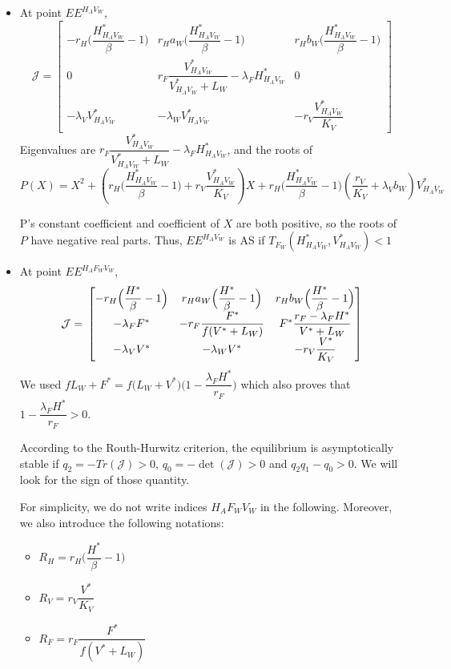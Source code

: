 \documentclass{article}
\newcommand{\lfw}{\lambda_{F}}
\newcommand{\lvw}{\lambda_{V}}
\newcommand{\lfv}{\lambda_{W}}
\begin{document}
\begin{itemize}
\item At point $EE^{H_AV_W}$,
\begin{equation}
\mathcal{J} =
\begin{bmatrix}
-r_H \Big(\dfrac{H^*_{H_AV_W} }{\beta}-1\Big) & r_H a_W \Big(\dfrac{H^*_{H_AV_W}}{\beta}-1\Big) & r_H b_W \Big(\dfrac{H^*_{H_AV_W}}{\beta}-1\Big) \\
0 & r_F \dfrac{V^*_{H_AV_W}}{V^*_{H_AV_W} + L_W}-\lfw H^*_{H_AV_W}  & 0 \\
-\lvw V^*_{H_AV_W} & -\lfv V^*_{H_AV_W} & -r_V \dfrac{V^*_{H_AV_W}}{K_V} 
\end{bmatrix}
\end{equation}
Eigenvalues are $r_F\dfrac{V^*_{H_AV_W}}{V^*_{H_AV_W} + L_W}-\lfw H^*_{H_AV_W}$, and the roots of
$$
P(X) = X^2 + \left(r_H \Big(\dfrac{H^*_{H_AV_W}}{\beta}-1\Big) + r_V \dfrac{V^*_{H_AV_W}}{K_V}  \right) X + r_H \Big(\dfrac{H^*_{H_AV_W}}{\beta}-1\Big) \left(\dfrac{r_V}{K_V} +  \lvw b_W \right) V^*_{H_AV_W}
$$

P's constant coefficient and coefficient of $X$ are both positive, so the roots of $P$ have negative real parts. Thus,  $EE^{H_AV_W}$ is AS if $T_{F_W}(H^*_{H_AV_W}, V^*_{H_AV_W}) < 1$

\item At point $EE^{H_AF_WV_W}$, 
\begin{equation}
\mathcal{J} = \\
\begin{bmatrix}
-r_H \Big(\dfrac{H^*}{\beta}-1\Big) & r_H a_W \Big(\dfrac{H^*}{\beta}-1\Big) & r_H b_W \Big(\dfrac{H^*}{\beta}-1\Big) \\
-\lfw F^* & -r_F \dfrac{F^*}{f(V^* + L_W)} & F^* \dfrac{r_F - \lfw H^*}{V^* + L_W}\\
-\lvw V^* & -\lfv V^* & -r_V \dfrac{V^*}{K_V} 
\end{bmatrix}
\end{equation}
We used $f L_W + F^* = f\Big( L_W + V^* \Big) \Big(1 - \dfrac{\lfw H^*}{r_F} \Big)$ which also proves that $1 - \dfrac{\lfw H^*}{r_F} > 0$.

According to the Routh-Hurwitz criterion, the equilibrium is asymptotically stable if $q_2 = - Tr(\mathcal{J}) > 0$, $q_0 = -\det(\mathcal{J}) > 0$ and $q_2 q_1 - q_0 > 0$. We will look for the sign of those quantity.

For simplicity, we do not write indices ${H_AF_WV_W}$ in the following. Moreover, we also introduce the following notations:
\begin{itemize}
\item $R_H = r_H \Big(\dfrac{H^*}{\beta} -1 \Big) $
\item $R_V = r_V \dfrac{V^*}{K_V}$
\item $R_F = r_F \dfrac{F^*}{f(V^* + L_W)}$
\end{itemize}


\end{itemize}
\end{document}
